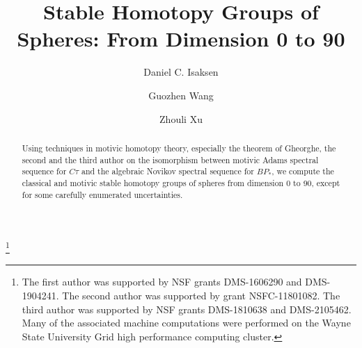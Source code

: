 \documentclass{memo-l}
\theoremstyle{definition}
\theoremstyle{remark}
\numberwithin{section}{chapter}
\numberwithin{equation}{chapter}
\newcommand{\rev}[1]{#1} %
\begin{document}
\frontmatter

\title{\rev{Stable Homotopy Groups of Spheres: From Dimension 0 to 90}}

\author{Daniel C. Isaksen}
\address{
Department of Mathematics, 
Wayne State University, 
Detroit, MI 48202, USA}

\thanks{The first author was supported by NSF grants
DMS-1606290 and DMS-1904241.
The second author was supported by grant NSFC-11801082. 
The third author was supported by NSF grants DMS-1810638 and DMS-2105462.
Many of the associated machine computations were performed on the
Wayne State University Grid high performance computing cluster.}

\author{Guozhen Wang}
\address{Shanghai Center for Mathematical Sciences, Fudan University, Shanghai, China, 200433}

\author{Zhouli Xu}
\address{Department of Mathematics, UC San Diego, La Jolla, CA 92093, USA}



\date{}

\begin{abstract}
\rev{Using techniques in motivic homotopy theory, especially the theorem of Gheorghe, the second and the third author on the isomorphism between motivic Adams spectral sequence for $C\tau$ and the algebraic Novikov spectral sequence for $BP_*$,
we compute the classical and motivic stable homotopy groups of spheres 
from dimension 0 to 90},
except for
some carefully enumerated uncertainties.
\end{abstract}

\maketitle

%
\end{document}
